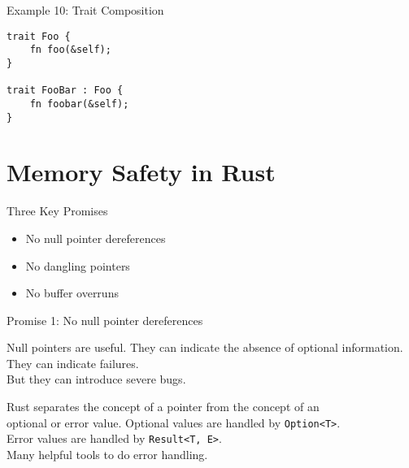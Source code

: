 \documentclass[aspectratio=1610,t]{beamer}
\begin{document}

\begin{frame}[fragile]{Example 10: Trait Composition}
\begin{verbatim}
trait Foo {
    fn foo(&self);
}

trait FooBar : Foo {
    fn foobar(&self);
}
\end{verbatim}
\end{frame}


\section{Memory Safety in Rust}


\begin{frame}{Three Key Promises}

\begin{itemize}
	\item No null pointer dereferences
	\pause
	\item No dangling pointers
	\pause
	\item No buffer overruns
\end{itemize}

\end{frame}


\begin{frame}{Promise 1: No null pointer dereferences}

\begin{block}{Null pointers are useful.}
They can indicate the absence of optional information.\\
They can indicate failures.\\
\pause
But they can introduce severe bugs.
\end{block}
\vspace{1em}
\pause
\begin{block}{Rust separates the concept of a pointer from the concept of an\\
		optional or error value.}
	Optional values are handled by \texttt{Option<T>}.\\
  Error values are handled by \texttt{Result<T, E>}.\\
	Many helpful tools to do error handling.
\end{block}

\end{frame}
\end{document}
